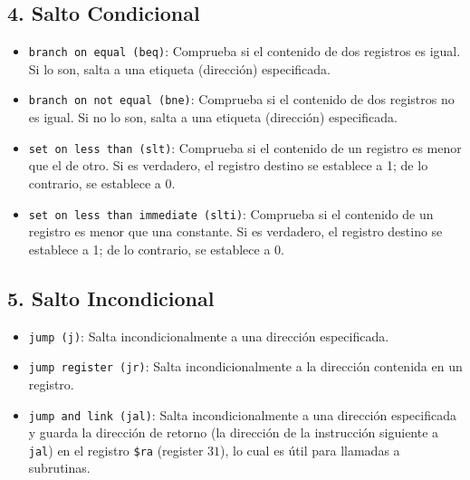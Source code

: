 \documentclass{article}
\begin{document}
\subsection*{4. Salto Condicional}
\begin{itemize}
    \item \texttt{branch on equal (beq)}: Comprueba si el contenido de dos registros es igual. Si lo son, salta a una etiqueta (dirección) especificada.
    \item \texttt{branch on not equal (bne)}: Comprueba si el contenido de dos registros no es igual. Si no lo son, salta a una etiqueta (dirección) especificada.
    \item \texttt{set on less than (slt)}: Comprueba si el contenido de un registro es menor que el de otro. Si es verdadero, el registro destino se establece a 1; de lo contrario, se establece a 0.
    \item \texttt{set on less than immediate (slti)}: Comprueba si el contenido de un registro es menor que una constante. Si es verdadero, el registro destino se establece a 1; de lo contrario, se establece a 0.
\end{itemize}

\subsection*{5. Salto Incondicional}
\begin{itemize}
    \item \texttt{jump (j)}: Salta incondicionalmente a una dirección especificada.
    \item \texttt{jump register (jr)}: Salta incondicionalmente a la dirección contenida en un registro.
    \item \texttt{jump and link (jal)}: Salta incondicionalmente a una dirección especificada y guarda la dirección de retorno (la dirección de la instrucción siguiente a \texttt{jal}) en el registro \texttt{\$ra} (register $31$), lo cual es útil para llamadas a subrutinas.
\end{itemize}
\end{document}
